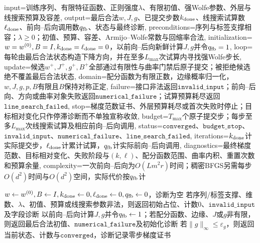 \begin{AlgorithmContract}{
  input={训练序列、有限特征函数、正则强度$\lambda$、有限初值、强Wolfe参数、外层与线搜索预算及容差},
  output={最后合法$w,J,g$、已提交步数$k_{\rm done}$、线搜索试算数$\ell_{\rm done}$、前向--后向调用数$q_{\rm fb}$、状态与最终诊断},
  preconditions={序列与标签支撑相容；$\lambda\ge0$；初值、预算、容差、Armijo--Wolfe常数与回缩率合法},
  initialization={$w=w^{(0)},B=I,k_{\rm done}=\ell_{\rm done}=0$，以前向--后向新鲜计算$J,g$并令$q_{\rm fb}=1$},
  loop={每轮由最后合法状态构造下降方向，并在至多$L_{\max}$次试算内寻找强Wolfe步长},
  update={候选$w^+,J^+,g^+,B^+$全部通过有限性与曲率门禁后原子提交；被拒绝候选绝不覆盖最后合法状态},
  domain={配分函数为有限正数，边缘概率归一化，$w,J,g,p,B$有限且$B$保持对称正定},
  failure={接口非法返回$\mathtt{invalid\_input}$；前向--后向、方向或曲率对象失败返回$\mathtt{numerical\_failure}$；试算预算耗尽返回$\mathtt{line\_search\_failed}$},
  stop={梯度范数证书、外层预算耗尽或首次失败时停止；目标相对变化只作停滞诊断而不单独宣称收敛},
  budget={$T_{\max}$个原子提交步；每步至多$L_{\max}$次线搜索试算及相应前向--后向调用},
  status={$\mathtt{converged}$、$\mathtt{budget\_stop}$、$\mathtt{invalid\_input}$、$\mathtt{numerical\_failure}$、$\mathtt{line\_search\_failed}$},
  iterations={$k_{\rm done}$计实际提交步，$\ell_{\rm done}$计累计试算，$q_{\rm fb}$计实际前向--后向调用},
  diagnostics={最终梯度范数、目标相对变化、失败阶段与$(k,\ell)$、配分函数范围、曲率内积、重置次数和预算余量},
  complexity={一次前向--后向为$O(Lm^2r)$时间；稠密BFGS另需每步$O(d^2)$时间与$O(d^2)$空间，实际代价按$q_{\rm fb}$计}
}
\begin{algorithm}[H]
\caption{线性链CRF的BFGS学习}\label{alg:V3-C06-bfgs}
$w\leftarrow w^{(0)},B\leftarrow I,k_{\rm done}\leftarrow0,\ell_{\rm done}\leftarrow0,q_{\rm fb}\leftarrow0$，诊断为空\;
若序列/标签支撑、维数、$\lambda$、初值、预算或线搜索参数非法，则返回初始占位、计数$0$、$\mathtt{invalid\_input}$及字段诊断\;
以前向--后向计算$J,g$并令$q_{\rm fb}\leftarrow1$；若配分函数、边缘、$J$或$g$非有限，则返回最后合法初值、$\mathtt{numerical\_failure}$及初始化诊断\;
\label{struct:V3-C06-CH22}
若$\|g\|_\infty\le\varepsilon_g$，则返回当前状态、计数与$\mathtt{converged}$，诊断记录零步梯度证书\;
\end{algorithm}
\end{AlgorithmContract}
